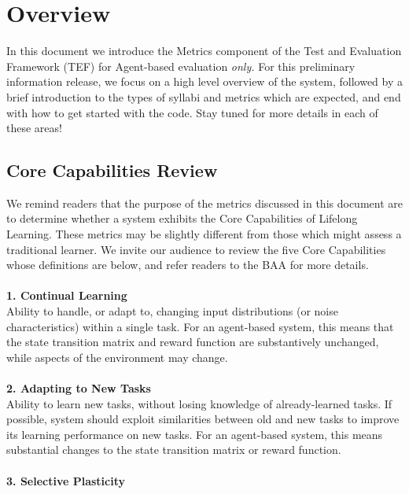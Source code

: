 \chapter{Overview}\label{ch:overview}

In this document we introduce the Metrics component of the Test and Evaluation Framework (TEF) for Agent-based evaluation \textit{only.} For this preliminary information release, we focus on a high level overview of the system, followed by a brief introduction to the types of syllabi and metrics which are expected, and end with how to get started with the code. Stay tuned for more details in each of these areas!

\section{Core Capabilities Review}
\label{sec:core_capabilities}

We remind readers that the purpose of the metrics discussed in this document are to determine whether a system exhibits the Core Capabilities of Lifelong Learning. These metrics may be slightly different from those which might assess a traditional learner. We invite our audience to review the five Core Capabilities whose definitions are below, and refer readers to the BAA for more details.\\%
\\
\textbf{1. Continual Learning}\\

Ability to handle, or adapt to, changing input distributions (or noise characteristics) within a single task. For an agent-based system, this means that the state transition matrix and reward function are substantively unchanged, while aspects of the environment may change.\\
\\
\textbf{2. Adapting to New Tasks}\\

Ability to learn new tasks, without losing knowledge of already-learned tasks. If possible, system should exploit similarities between old and new tasks to improve its learning performance on new tasks. For an agent-based system, this means substantial changes to the state transition matrix or reward function.\\
\\
\textbf{3. Selective Plasticity}\\

